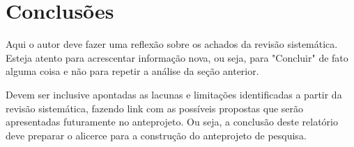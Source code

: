 \documentclass[12pt]{article}
\begin{document}
\section{Conclusões}

Aqui o autor deve fazer uma reflexão sobre os achados da revisão sistemática. Esteja atento para acrescentar informação nova, ou seja, para "Concluir" de fato alguma coisa e não para repetir a análise da seção anterior.

Devem ser inclusive apontadas as lacunas e limitações identificadas a partir da revisão sistemática, fazendo link com as possíveis propostas que serão apresentadas futuramente no anteprojeto. Ou seja, a conclusão deste relatório deve preparar o alicerce para a construção do anteprojeto de pesquisa.





\end{document}
